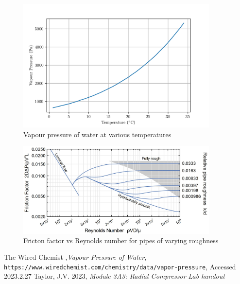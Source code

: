 \documentclass{article}
\begin{document}
\begin{figure}[H]
    \centering
    \includegraphics[width=0.9\textwidth]{vapour_pressure_water.png}
    \caption{Vapour pressure of water at various temperatures \cite{vapour_pressure}}
    \label{fig:vapour_pressure_water}
\end{figure}

\begin{figure}[H]
    \centering
    \includegraphics[width=0.9\textwidth]{re_roughness.jpg}
    \caption{Fricton factor vs Reynolds number for pipes of varying roughness \cite{handout}}
    \label{fig:Re_vs_friction_factor}
\end{figure}

\begin{thebibliography}{9}
    The Wired Chemist ,\textit{Vapour Pressure of Water}, \texttt{https://www.wiredchemist.com/chemistry/data/vapor-pressure}, Accessed 2023.2.27
    Taylor, J.V. 2023, \textit{Module 3A3: Radial Compressor Lab handout}
\end{thebibliography}
\end{document}
